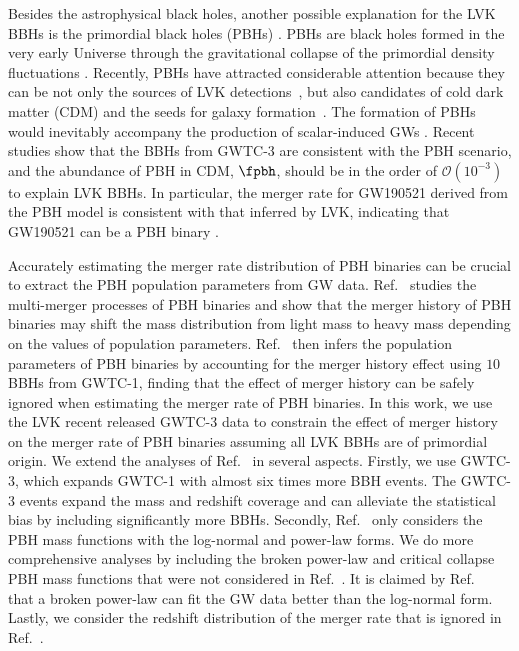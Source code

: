 \documentclass[
reprint,           %
superscriptaddress,%
amsmath,           %
amssymb,           %
aps,               %
prd,               %
notitlepage,       %
longbibliography,  %
floatfix,          %
nofootinbib,
]{revtex4-1}
\begin{document}
Besides the astrophysical black holes, another possible explanation for the LVK BBHs is the primordial black holes (PBHs) \cite{Bird:2016dcv,Sasaki:2016jop,Chen:2018czv,Liu:2018ess,Chen:2021nxo}. 
PBHs are black holes formed in the very early Universe through the gravitational collapse of the primordial density fluctuations \cite{Hawking:1971ei,Carr:1974nx}. Recently, PBHs have attracted considerable attention \cite{Garcia-Bellido:2017mdw,Carr:2017jsz,Germani:2017bcs,Liu:2019rnx,Cai:2019elf,Cai:2019bmk,DeLuca:2020sae,Vaskonen:2020lbd,DeLuca:2020agl,Hutsi:2020sol,Sasaki:2018dmp,Carr:2020gox,Carr:2020xqk,Liu:2021jnw,Wang:2022nml,Franciolini:2022tfm} because they can be not only the sources of LVK detections~\cite{Bird:2016dcv,Sasaki:2016jop}, but also candidates of cold dark matter (CDM) \cite{Carr:2016drx} and the seeds for galaxy formation~\cite{Bean:2002kx,Kawasaki:2012kn}. The formation of PBHs would inevitably accompany the production of scalar-induced GWs \cite{Saito:2008jc,Yuan:2019udt,Yuan:2019wwo,Yuan:2019fwv,Chen:2019xse,DeLuca:2019ufz,Bartolo:2018rku,Bartolo:2018evs}.
Recent studies \cite{Chen:2021nxo,Chen:2022fda} show that the BBHs from GWTC-3 are consistent with the PBH scenario, and the abundance of PBH in CDM, $\fpbh$, should be in the order of $\mathcal{O}(10^{-3})$ to explain LVK BBHs. In particular, the merger rate for GW190521 derived from the PBH model is consistent with that inferred by LVK, indicating that GW190521 can be a PBH binary \cite{DeLuca:2020sae,Chen:2021nxo}.

Accurately estimating the merger rate distribution of PBH binaries can be crucial to extract the PBH population parameters from GW data. Ref.~\cite{Liu:2019rnx} studies the multi-merger processes of PBH binaries and show that the merger history of PBH binaries may shift the mass distribution from light mass to heavy mass depending on the values of population parameters. Ref.~\cite{Wu:2020drm} then infers the population parameters of PBH binaries by accounting for the merger history effect using $10$ BBHs from GWTC-1, finding that the effect of merger history can be safely ignored when estimating the merger rate of PBH binaries. 
In this work, we use the LVK recent released GWTC-3 data to constrain the effect of merger history on the merger rate of PBH binaries assuming all LVK BBHs are of primordial origin.
We extend the analyses of Ref.~\cite{Wu:2020drm} in several aspects. Firstly, we use GWTC-3, which expands GWTC-1 with almost six times more BBH events. The GWTC-3 events expand the mass and redshift coverage and can alleviate the statistical bias by including significantly more BBHs. Secondly, Ref.~\cite{Wu:2020drm} only considers the PBH mass functions with the log-normal and power-law forms. We do more comprehensive analyses by including the broken power-law and critical collapse PBH mass functions that were not considered in Ref.~\cite{Wu:2020drm}. It is claimed by Ref.~\cite{Deng:2021ezy} that a broken power-law can fit the GW data better than the log-normal form. Lastly, we consider the redshift distribution of the merger rate that is ignored in Ref.~\cite{Wu:2020drm}.
\end{document}
